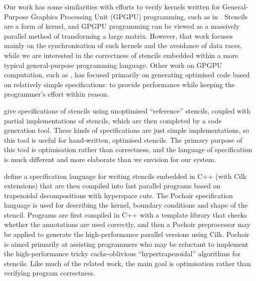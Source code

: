 \documentclass[9pt]{sigplanconf}
\theoremstyle{definition}
\begin{document}
Our work has some similarities with efforts to verify kernels
written for General-Purpose Graphics Processing Unit (GPGPU)
programming, such as in \citet{Blom:2014:SoCP}. Stencils are a form of
kernel, and GPGPU programming can be viewed as a massively parallel
method of transforming a large matrix. However, that work focuses
mainly on the synchronisation of such kernels and the avoidance of
data races, while we are interested in the correctness of stencils
embedded within a more typical general-purpose programming
language. Other work on GPGPU computation, such as
\citet{Zhang:2012:CGO}, has focused primarily on generating
optimised code based on relatively simple specifications: to
provide performance while keeping the programmer's effort within
reason.

\citet{Solar-Lezama:2007:PLDI} give specifications of stencils using
unoptimised ``reference'' stencils, coupled with partial
implementations of stencils, which are then completed by a code
generation tool. These kinds of specifications are just simple
implementations, so this tool is useful for hand-written, optimised
stencils. The primary purpose of this tool is optimisation rather than
correctness, and the language of specification is much different and
more elaborate than we envision for our system.

\citet{Tang:2011:SPAA} define a specification language for writing
stencils embedded in C++ (with Cilk extensions) that are then compiled
into fast parallel programs based on trapezoidal decompositions with
hyperspace cuts. The Pochoir specification language is used for
describing the kernel, boundary conditions and shape of the
stencil. Programs are first compiled in C++ with a template library
that checks whether the annotations are used correctly, and then a
Pochoir preprocessor may be applied to generate the high-performance
parallel versions using Cilk.  Pochoir
is aimed primarily at assisting programmers who may be reluctant to
implement the high-performance tricky cache-oblivious
``hypertrapezoidal'' algorithms for stencils. 
Like much of the related work, the main goal 
is optimisation rather than verifying program correctness.
\end{document}
